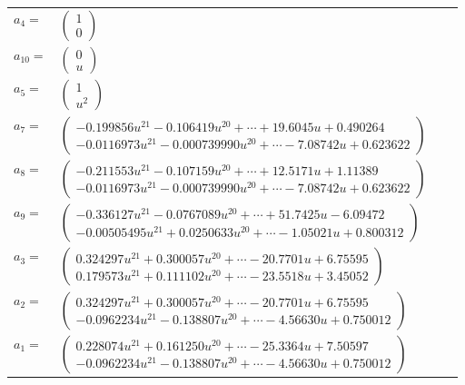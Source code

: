 \documentclass[1p]{elsarticle_modified}
\theoremstyle{definition}
\begin{document}
\begin{tabular}{m{7pt} m{180pt} m{7pt} m{180pt} }
\flushright $a_{4}=$&$\begin{pmatrix}1\\0\end{pmatrix}$ \\
\flushright $a_{10}=$&$\begin{pmatrix}0\\u\end{pmatrix}$ \\
\flushright $a_{5}=$&$\begin{pmatrix}1\\u^2\end{pmatrix}$ \\
\flushright $a_{7}=$&$\begin{pmatrix}-0.199856 u^{21}-0.106419 u^{20}+\cdots+19.6045 u+0.490264\\-0.0116973 u^{21}-0.000739990 u^{20}+\cdots-7.08742 u+0.623622\end{pmatrix}$ \\
\flushright $a_{8}=$&$\begin{pmatrix}-0.211553 u^{21}-0.107159 u^{20}+\cdots+12.5171 u+1.11389\\-0.0116973 u^{21}-0.000739990 u^{20}+\cdots-7.08742 u+0.623622\end{pmatrix}$ \\
\flushright $a_{9}=$&$\begin{pmatrix}-0.336127 u^{21}-0.0767089 u^{20}+\cdots+51.7425 u-6.09472\\-0.00505495 u^{21}+0.0250633 u^{20}+\cdots-1.05021 u+0.800312\end{pmatrix}$ \\
\flushright $a_{3}=$&$\begin{pmatrix}0.324297 u^{21}+0.300057 u^{20}+\cdots-20.7701 u+6.75595\\0.179573 u^{21}+0.111102 u^{20}+\cdots-23.5518 u+3.45052\end{pmatrix}$ \\
\flushright $a_{2}=$&$\begin{pmatrix}0.324297 u^{21}+0.300057 u^{20}+\cdots-20.7701 u+6.75595\\-0.0962234 u^{21}-0.138807 u^{20}+\cdots-4.56630 u+0.750012\end{pmatrix}$ \\
\flushright $a_{1}=$&$\begin{pmatrix}0.228074 u^{21}+0.161250 u^{20}+\cdots-25.3364 u+7.50597\\-0.0962234 u^{21}-0.138807 u^{20}+\cdots-4.56630 u+0.750012\end{pmatrix}$ \\

\end{tabular}
\end{document}
